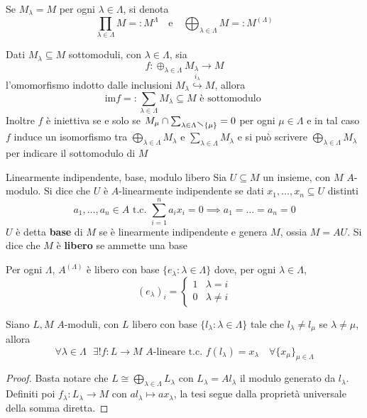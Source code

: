 \begin{note}[zione]
    Se \(M_\lambda = M\) per ogni \(\lambda \in \Lambda\), si denota
    \[
      \prod_{\lambda \in \Lambda} M =: M^{\Lambda} \quad \text{e} \quad
      \bigoplus_{\lambda \in \Lambda} M =: M^{{(\Lambda)}}
    \]
\end{note}

    Dati \(M_\lambda \subseteq M \) sottomoduli, con \(\lambda \in \Lambda
    \), sia \[f : \oplus_{\lambda \in \Lambda} M_\lambda \to M\] l'omomorfismo indotto
    dalle inclusioni \(M_\lambda \overset{i_{\lambda} }{\hookrightarrow }  M \), allora
    \[
      \mathrm{im}f =: \sum_{\lambda \in \Lambda} M_\lambda \subseteq M \text{ è sottomodulo } 
    \]
    Inoltre \(f\) è iniettiva se e solo se \(M_{\mu} \cap \sum_{\lambda \in \Lambda \sminus \{\mu\} } = 0  \) per ogni \(\mu \in \Lambda\) e in tal caso \(f\) induce un isomorfismo tra \(\bigoplus_{\lambda \in \Lambda} M_\lambda \) e \(\sum_{\lambda \in \Lambda} M_\lambda\) e si può scrivere \(\bigoplus_{\lambda \in \Lambda} M_\lambda\) per indicare il sottomodulo di \(M\) 


\begin{definition}{Linearmente indipendente, base, modulo libero}
    Sia \(U \subseteq M \) un insieme, con \(M\) \(A\)-modulo. Si dice che \(U\) è \(A\)-linearmente indipendente se dati \(x_{1},\dots,x_{n} \subseteq U \) distinti 
    \[
      a_{1}, \dots, a_{n} \in A \text{ t.c. } \sum_{i=1}^{n} a_{i} x_{i} = 0 \implies a_{1} = \dots = a_{n} = 0 
    \]
    \(U\) è detta \textbf{base} di \(M\) se è linearmente indipendente e genera
    \(M\), ossia \(M = AU\). Si dice che \(M\) è \textbf{libero} se ammette una
    base
\end{definition}

\begin{example}{}
    Per ogni \(\Lambda\), \(A^{{(\Lambda)}}\) è libero con base \(\{e_\lambda : \lambda \in  \Lambda\} \) dove, per ogni \(\lambda \in \Lambda\),
    \[
        (e_\lambda)_i = \begin{cases}{}
            1 & \lambda = i \\
            0 & \lambda \neq i
        \end{cases}
    \]
\end{example}

\begin{proposition}{}
    Siano \(L, M\) \(A\)-moduli, con \(L\) libero con base \(\{l_\lambda : \lambda \in \Lambda\} \) tale che \(l_\lambda \neq l_\mu\) se \(\lambda \neq \mu\), allora
    \[
      \forall \lambda \in  \Lambda \,\,\,\, \exists ! f :
  L\to M \,\, A\text{-lineare t.c. }f{(l_\lambda)} = x_\lambda \quad \forall
  \{x_\mu\}_{\mu \in \Lambda}  
    \]
\end{proposition}
\begin{proof}{}
    Basta notare che \(L \cong \bigoplus_{\lambda \in \Lambda} L_\lambda
    \) con \(L_\lambda = Al_\lambda \) il modulo generato da
    \(l_\lambda\). Definiti poi \(f_\lambda : L_\lambda \to M\) con
    \(al_\lambda \mapsto ax_\lambda\), la tesi segue dalla proprietà
    universale della somma diretta.
\end{proof}

